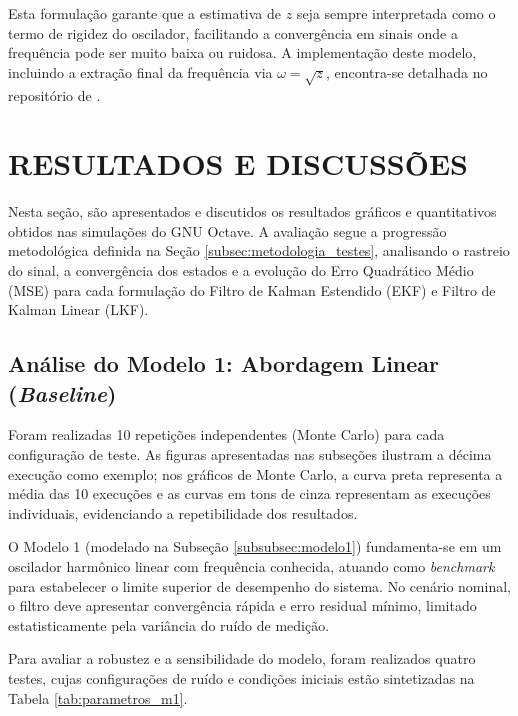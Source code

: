 \documentclass[a4paper,12pt]{article}
\begin{document}
Esta formulação garante que a estimativa de $z$ seja sempre interpretada como o termo de rigidez do oscilador, facilitando a convergência em sinais onde a frequência pode ser muito baixa ou ruidosa. A implementação deste modelo, incluindo a extração final da frequência via $\omega = \sqrt{z}$, encontra-se detalhada no repositório de .



\section{RESULTADOS E DISCUSSÕES}
\label{sec:resultados}

Nesta seção, são apresentados e discutidos os resultados gráficos e quantitativos obtidos nas simulações do GNU Octave. A avaliação segue a progressão metodológica definida na Seção \ref{subsec:metodologia_testes}, analisando o rastreio do sinal, a convergência dos estados e a evolução do Erro Quadrático Médio (MSE) para cada formulação do Filtro de Kalman Estendido (EKF) e Filtro de Kalman Linear (LKF).

\subsection{Análise do Modelo 1: Abordagem Linear (\textit{Baseline})}
\label{subsec:resultados_mod1_linear}

Foram realizadas 10 repetições independentes (Monte Carlo) para cada configuração de teste. As figuras apresentadas nas subseções ilustram a décima execução como exemplo; nos gráficos de Monte Carlo, a curva preta representa a média das 10 execuções e as curvas em tons de cinza representam as execuções individuais, evidenciando a repetibilidade dos resultados.

O Modelo 1 (modelado na Subseção \ref{subsubsec:modelo1}) fundamenta-se em um oscilador harmônico linear com frequência conhecida, atuando como \textit{benchmark} para estabelecer o limite superior de desempenho do sistema. No cenário nominal, o filtro deve apresentar convergência rápida e erro residual mínimo, limitado estatisticamente pela variância do ruído de medição.

Para avaliar a robustez e a sensibilidade do modelo, foram realizados quatro testes, cujas configurações de ruído e condições iniciais estão sintetizadas na Tabela \ref{tab:parametros_m1}.
\end{document}
